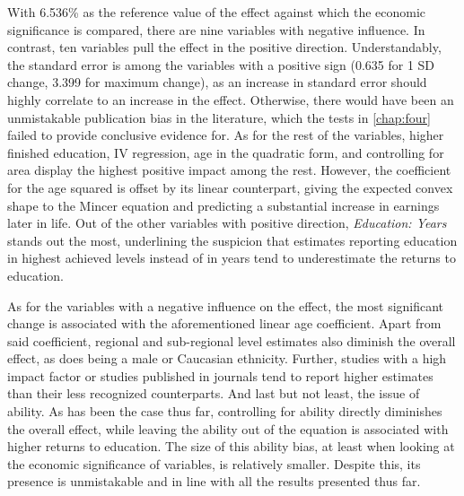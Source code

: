 With 6.536\% as the reference value of the effect against which the economic significance is compared, there are nine variables with negative influence. In contrast, ten variables pull the effect in the positive direction. Understandably, the standard error is among the variables with a positive sign (0.635 for 1 SD change, 3.399 for maximum change), as an increase in standard error should highly correlate to an increase in the effect. Otherwise, there would have been an unmistakable publication bias in the literature, which the tests in \autoref{chap:four} failed to provide conclusive evidence for. As for the rest of the variables, higher finished education, \ac{IV} regression, age in the quadratic form, and controlling for area display the highest positive impact among the rest. However, the coefficient for the age squared is offset by its linear counterpart, giving the expected convex shape to the Mincer equation and predicting a substantial increase in earnings later in life. Out of the other variables with positive direction, \textit{Education: Years} stands out the most, underlining the suspicion that estimates reporting education in highest achieved levels instead of in years tend to underestimate the returns to education.

As for the variables with a negative influence on the effect, the most significant change is associated with the aforementioned linear age coefficient. Apart from said coefficient, regional and sub-regional level estimates also diminish the overall effect, as does being a male or Caucasian ethnicity. Further, studies with a high impact factor or studies published in journals tend to report higher estimates than their less recognized counterparts. And last but not least, the issue of ability. As has been the case thus far, controlling for ability directly diminishes the overall effect, while leaving the ability out of the equation is associated with higher returns to education. The size of this ability bias, at least when looking at the economic significance of variables, is relatively smaller. Despite this, its presence is unmistakable and in line with all the results presented thus far.